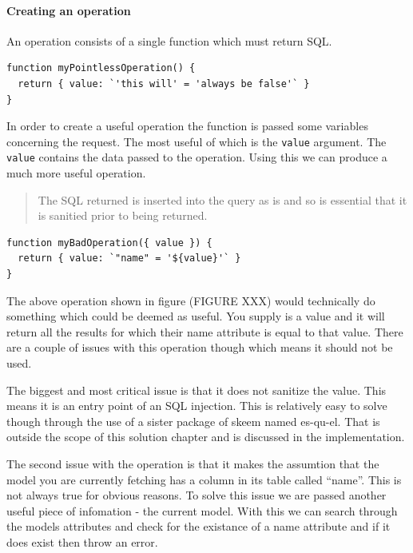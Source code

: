 \documentclass[
  12pt,
]{article}
\newcommand{\passthrough}[1]{#1}
\let\oldparagraph\paragraph
\renewcommand{\paragraph}[1]{\oldparagraph{#1}\mbox{}}
\begin{document}
\hypertarget{creating-an-operation}{%
\paragraph{Creating an operation}\label{creating-an-operation}}

An operation consists of a single function which must return SQL.

\begin{lstlisting}[caption={The simplist custom operation - it would always return false and so is utterly pointless.}]
function myPointlessOperation() {
  return { value: `'this will' = 'always be false'` }
}
\end{lstlisting}

In order to create a useful operation the function is passed some
variables concerning the request. The most useful of which is the
\passthrough{\lstinline!value!} argument. The
\passthrough{\lstinline!value!} contains the data passed to the
operation. Using this we can produce a much more useful operation.

\begin{quote}
The SQL returned is inserted into the query as is and so is essential
that it is sanitied prior to being returned.
\end{quote}

\begin{lstlisting}[caption={Returns all the records for which the name matches the value supplied. However there are major issues with this and should not be used.}]
function myBadOperation({ value }) {
  return { value: `"name" = '${value}'` }
}
\end{lstlisting}

The above operation shown in figure (FIGURE XXX) would technically do
something which could be deemed as useful. You supply is a value and it
will return all the results for which their name attribute is equal to
that value. There are a couple of issues with this operation though
which means it should not be used.

The biggest and most critical issue is that it does not sanitize the
value. This means it is an entry point of an SQL injection. This is
relatively easy to solve though through the use of a sister package of
skeem named es-qu-el. That is outside the scope of this solution chapter
and is discussed in the implementation.

The second issue with the operation is that it makes the assumtion that
the model you are currently fetching has a column in its table called
``name''. This is not always true for obvious reasons. To solve this
issue we are passed another useful piece of infomation - the current
model. With this we can search through the models attributes and check
for the existance of a name attribute and if it does exist then throw an
error.
\end{document}
